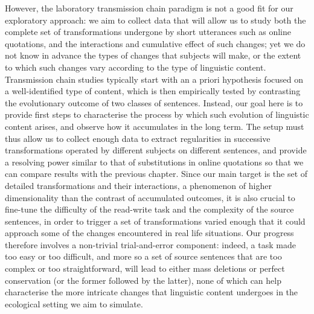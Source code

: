 \documentclass[a4paper,fleqn]{cas-dc}
\begin{document}
However, the laboratory transmission chain paradigm is not a good fit
for our exploratory approach: we aim to collect data that will allow us
to study both the complete set of transformations undergone by short
utterances such as online quotations, and the interactions and
cumulative effect of such changes; yet we do not know in advance the
types of changes that subjects will make, or the extent to which such
changes vary according to the type of linguistic content. Transmission
chain studies typically start with an a priori hypothesis focused on a
well-identified type of content, which is then empirically tested by
contrasting the evolutionary outcome of two classes of sentences.
Instead, our goal here is to provide first steps to characterise the
process by which such evolution of linguistic content arises, and
observe how it accumulates in the long term. The setup must thus allow
us to collect enough data to extract regularities in successive
transformations operated by different subjects on different sentences,
and provide a resolving power similar to that of substitutions in online
quotations so that we can compare results with the previous chapter.
Since our main target is the set of detailed transformations and their
interactions, a phenomenon of higher dimensionality than the contrast of
accumulated outcomes, it is also crucial to fine-tune the difficulty of
the read-write task and the complexity of the source sentences, in order
to trigger a set of transformations varied enough that it could approach
some of the changes encountered in real life situations. Our progress
therefore involves a non-trivial trial-and-error component: indeed, a
task made too easy or too difficult, and more so a set of source
sentences that are too complex or too straightforward, will lead to
either mass deletions or perfect conservation (or the former followed by
the latter), none of which can help characterise the more intricate
changes that linguistic content undergoes in the ecological setting we
aim to simulate.
\end{document}
